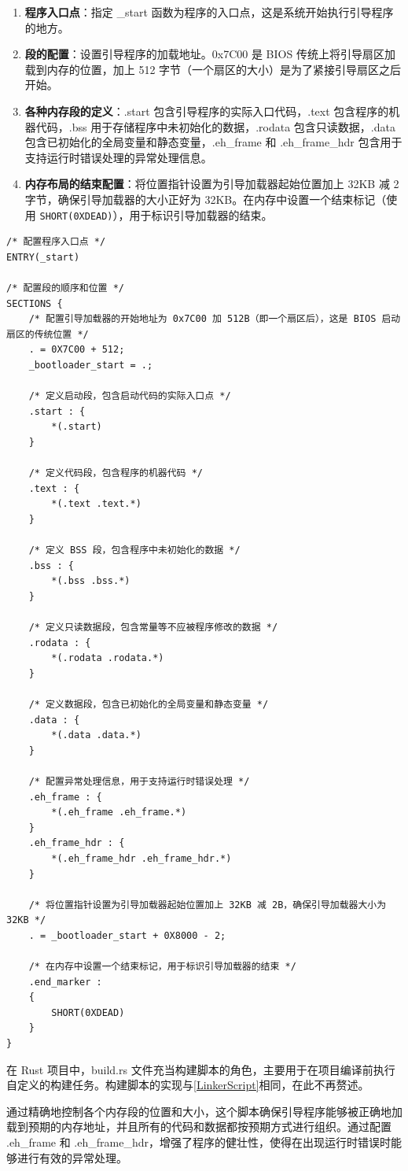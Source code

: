 \begin{enumerate}
    \item \textbf{程序入口点}：指定 \_start 函数为程序的入口点，这是系统开始执行引导程序的地方。
    \item \textbf{段的配置}：设置引导程序的加载地址。0x7C00 是 BIOS 传统上将引导扇区加载到内存的位置，加上 512 字节（一个扇区的大小）是为了紧接引导扇区之后开始。
    \item \textbf{各种内存段的定义}：.start 包含引导程序的实际入口代码，.text 包含程序的机器代码，.bss 用于存储程序中未初始化的数据，.rodata 包含只读数据，.data 包含已初始化的全局变量和静态变量，.eh\_frame 和 .eh\_frame\_hdr 包含用于支持运行时错误处理的异常处理信息。
    \item \textbf{内存布局的结束配置}：将位置指针设置为引导加载器起始位置加上 32KB 减 2 字节，确保引导加载器的大小正好为 32KB。在内存中设置一个结束标记（使用 \texttt{SHORT(0XDEAD)}），用于标识引导加载器的结束。
\end{enumerate}

\begin{listing}[htbp]
    \begin{verbatim}
/* 配置程序入口点 */
ENTRY(_start)

/* 配置段的顺序和位置 */
SECTIONS {
    /* 配置引导加载器的开始地址为 0x7C00 加 512B（即一个扇区后），这是 BIOS 启动扇区的传统位置 */
    . = 0X7C00 + 512;
    _bootloader_start = .;

    /* 定义启动段，包含启动代码的实际入口点 */
    .start : {
        *(.start)
    }

    /* 定义代码段，包含程序的机器代码 */
    .text : {
        *(.text .text.*)
    }

    /* 定义 BSS 段，包含程序中未初始化的数据 */
    .bss : {
        *(.bss .bss.*)
    }

    /* 定义只读数据段，包含常量等不应被程序修改的数据 */
    .rodata : {
        *(.rodata .rodata.*)
    }

    /* 定义数据段，包含已初始化的全局变量和静态变量 */
    .data : {
        *(.data .data.*)
    }

    /* 配置异常处理信息，用于支持运行时错误处理 */
    .eh_frame : {
        *(.eh_frame .eh_frame.*)
    }
    .eh_frame_hdr : {
        *(.eh_frame_hdr .eh_frame_hdr.*)
    }

    /* 将位置指针设置为引导加载器起始位置加上 32KB 减 2B，确保引导加载器大小为 32KB */
    . = _bootloader_start + 0X8000 - 2;

    /* 在内存中设置一个结束标记，用于标识引导加载器的结束 */
    .end_marker :
    {
        SHORT(0XDEAD)
    }
}
    \end{verbatim}
    \caption{bootloader/linker.ld}\label{lst:BootloaderLinkerScript}
\end{listing}

在 Rust 项目中，build.rs 文件充当构建脚本的角色，主要用于在项目编译前执行自定义的构建任务。构建脚本的实现与\cref{LinkerScript}相同，在此不再赘述。

通过精确地控制各个内存段的位置和大小，这个脚本确保引导程序能够被正确地加载到预期的内存地址，并且所有的代码和数据都按预期方式进行组织。通过配置 .eh\_frame 和 .eh\_frame\_hdr，增强了程序的健壮性，使得在出现运行时错误时能够进行有效的异常处理。